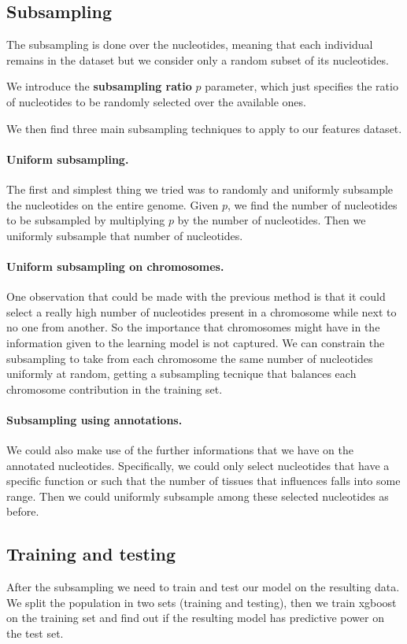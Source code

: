 \subsection{Subsampling}

The subsampling is done over the nucleotides, meaning that each individual remains in the dataset but we consider only a random subset of its nucleotides.

We introduce the \textbf{subsampling ratio} $p$ parameter, which just specifies the ratio of nucleotides to be randomly selected over the available ones.

We then find three main subsampling techniques to apply to our features dataset.

\paragraph{Uniform subsampling.}
The first and simplest thing we tried was to randomly and uniformly subsample the nucleotides on the entire genome.
Given $p$, we find the number of nucleotides to be subsampled by multiplying $p$ by the number of nucleotides.
Then we uniformly subsample that number of nucleotides.

\paragraph{Uniform subsampling on chromosomes.}
One observation that could be made with the previous method is that it could select a really high number of nucleotides present in a chromosome while next to no one from another. 
So the importance that chromosomes might have in the information given to the learning model is not captured. 
We can constrain the subsampling to take from each chromosome the same number of nucleotides uniformly at random, getting a subsampling tecnique that balances each chromosome contribution in the training set.

\paragraph{Subsampling using annotations.}
We could also make use of the further informations that we have on the annotated nucleotides.
Specifically, we could only select nucleotides that have a specific function or such that the number of tissues that influences falls into some range.
Then we could uniformly subsample among these selected nucleotides as before.


\subsection{Training and testing}

After the subsampling we need to train and test our model on the resulting data. 
We split the population in two sets (training and testing), then we train xgboost on the training set and find out if the resulting model has predictive power on the test set.
